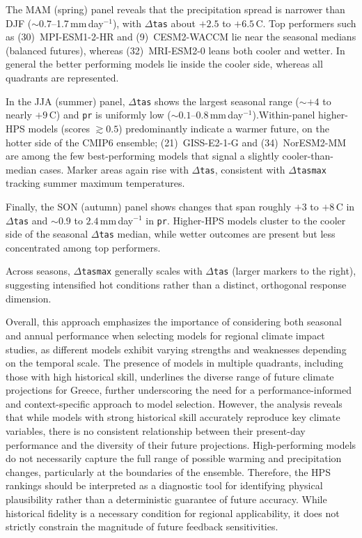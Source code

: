 \documentclass[pdflatex,sn-chicago]{sn-jnl}%
\theoremstyle{thmstyleone}%
\theoremstyle{thmstyletwo}%
\theoremstyle{thmstylethree}%
\begin{document}
The MAM (spring) panel reveals that the precipitation spread is narrower than DJF ($\sim 0.7$--1.7\,mm\,day$^{-1}$), with $\Delta$\texttt{tas} about $+2.5$ to $+6.5$\,\textdegree C. Top performers such as (30)~MPI-ESM1-2-HR and (9)~CESM2-WACCM lie near the seasonal medians (balanced futures), whereas (32)~MRI-ESM2-0 leans both cooler and wetter. In general the better performing models lie inside the cooler side, whereas all quadrants are represented. 

In the JJA (summer) panel, $\Delta$\texttt{tas} shows the largest seasonal range ($\sim +4$ to nearly $+9$\,\textdegree C) and \texttt{pr} is uniformly low ($\sim 0.1$--0.8\,mm\,day$^{-1}$).Within-panel higher-HPS models (scores $\gtrsim0.5$) predominantly indicate a warmer future, on the hotter side of the CMIP6 ensemble; (21)~GISS-E2-1-G and (34)~NorESM2-MM are among the few best-performing models that signal a slightly cooler-than-median cases. Marker areas again rise with $\Delta$\texttt{tas}, consistent with $\Delta$\texttt{tasmax} tracking summer maximum temperatures.

Finally, the SON (autumn) panel shows changes that span roughly $+3$ to $+8$\,\textdegree C in $\Delta$\texttt{tas} and $\sim0.9$ to $2.4$\,mm\,day$^{-1}$ in \texttt{pr}. Higher-HPS models cluster to the cooler side of the seasonal $\Delta$\texttt{tas} median, while wetter outcomes are present but less concentrated among top performers.

Across seasons, $\Delta$\texttt{tasmax} generally scales with $\Delta$\texttt{tas} (larger markers to the right), suggesting intensified hot conditions rather than a distinct, orthogonal response dimension. 

Overall, this approach emphasizes the importance of considering both seasonal and annual performance when selecting models for regional climate impact studies, as different models exhibit varying strengths and weaknesses depending on the temporal scale. The presence of models in multiple quadrants, including those with high historical skill, underlines the diverse range of future climate projections for Greece, further underscoring the need for a performance-informed and context-specific approach to model selection. However, the analysis reveals that while models with strong historical skill accurately reproduce key climate variables, there is no consistent relationship between their present-day performance and the diversity of their future projections. High-performing models do not necessarily capture the full range of possible warming and precipitation changes, particularly at the boundaries of the ensemble. Therefore, the HPS rankings should be interpreted as a diagnostic tool for identifying physical plausibility rather than a deterministic guarantee of future accuracy. While historical fidelity is a necessary condition for regional applicability, it does not strictly constrain the magnitude of future feedback sensitivities.
\end{document}
